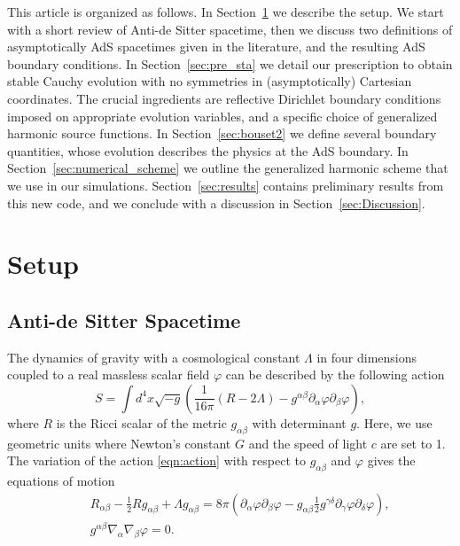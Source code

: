 \documentclass[a4paper,11pt]{article}
\begin{document}
This article is organized as follows. 
In Section~\ref{sec:setup} we describe the setup. We start with a short review of Anti-de Sitter spacetime, then we discuss two definitions of asymptotically AdS spacetimes given in the literature, and the resulting AdS boundary conditions.
In Section~\ref{sec:pre_sta} we detail our prescription to obtain stable Cauchy evolution with no symmetries in (asymptotically) Cartesian coordinates. The crucial ingredients are reflective Dirichlet boundary conditions imposed on appropriate evolution variables, and a specific choice of generalized harmonic source functions.
In Section~\ref{sec:bouset2} we define several boundary quantities, whose evolution describes the physics at the AdS boundary.
In Section~\ref{sec:numerical_scheme} we outline the generalized harmonic scheme that we use in our simulations. 
Section~\ref{sec:results} contains preliminary results from this new code, and we conclude with a discussion in Section~\ref{sec:Discussion}.

\section{Setup}\label{sec:setup}

\subsection{Anti-de Sitter Spacetime}\label{subsec:AdS}
The dynamics of gravity with a cosmological constant $\Lambda$ in four dimensions coupled to a real massless scalar field $\varphi$ can be described by the following action
\begin{equation}\label{eqn:action}
S = \int d^4 x \sqrt{-g} \left( \frac{1}{16\pi} \left( R - 2\Lambda \right) - g^{\alpha\beta} \partial_\alpha \varphi \partial_\beta \varphi \right),
\end{equation}
where $R$ is the Ricci scalar of the metric $g_{\alpha\beta}$ with determinant $g$.
Here, we use geometric units where Newton's constant $G$ and the speed of light $c$ are set to 1.
The variation of the action \eqref{eqn:action} with respect to $g_{\alpha\beta}$ and $\varphi$ gives the equations of motion
\begin{eqnarray}
\label{eqn:eoms1}
&&R_{\alpha\beta} - \frac{1}{2} R g_{\alpha\beta} + \Lambda g_{\alpha\beta} = 8\pi \left( \partial_\alpha \varphi \partial_\beta \varphi - g_{\alpha\beta} \frac{1}{2} g^{\gamma\delta} \partial_{\gamma} \varphi \partial_{\delta} \varphi \right),\\
\label{eqn:eoms2}
&&g^{\alpha\beta} \nabla_{\alpha} \nabla_{\beta} \varphi = 0.
\end{eqnarray}
\end{document}

